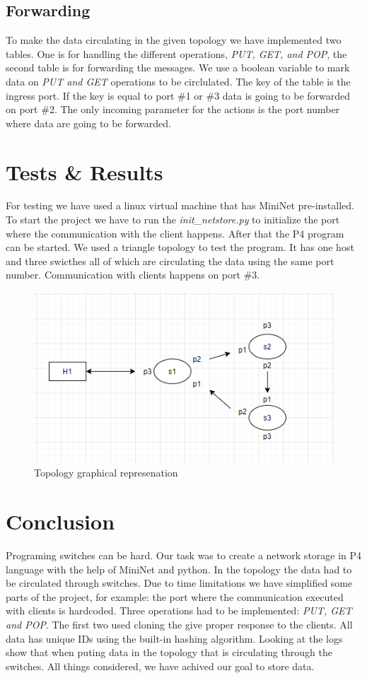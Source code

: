 \documentclass[sigconf,natbib=false]{acmart}
\begin{document}
\subsection{Forwarding}
To make the data circulating in the given topology we have implemented two tables. One is for handling the different operations, \textit{PUT, GET, and POP}, the second table is for forwarding the messages. We use a boolean variable to mark data on \textit{PUT and GET} operations to be circlulated. The key of the table is the ingress port. If the key is equal to port \#1 or \#3 data is going to be forwarded on port \#2. The only incoming parameter for the actions is the port number where data are going to be forwarded.
\section{Tests \& Results}
For testing we have used a linux virtual machine that has MiniNet pre-installed. To start the project we have to run the \textit{init\_netstore.py} to initialize the port where the communication with the client happens. After that the P4 program can be started. We used a triangle topology to test the program. It has one host and three swicthes all of which are circulating the data using the same port number. Communication with clients happens on port \#3.
\begin{figure}[ht]
	\caption{Topology graphical represenation}
	\includegraphics[scale=0.7]{top.png}
	\centering
\end{figure}

\section{Conclusion}
Programing switches can be hard. Our task was to create a network storage in P4 language with the help of MiniNet and python. In the topology the data had to be circulated through switches. Due to time limitations we have simplified some parts of the project, for example: the port where the communication executed with clients is hardcoded. Three operations had to be implemented: \textit{PUT, GET and POP}. The first two used cloning the give proper response to the clients. All data has unique IDs using the built-in hashing algorithm. Looking at the logs show that when puting data in the topology that is circulating through the switches. All things considered, we have achived our goal to store data.



\printbibliography
\end{document}
